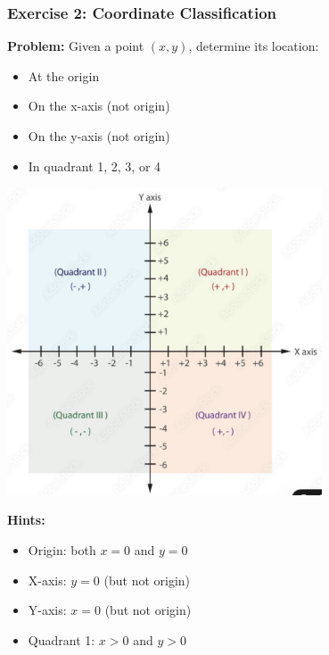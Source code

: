 \documentclass{beamer}
\begin{document}
\begin{frame}[fragile]
\frametitle{Exercise 2: Coordinate Classification}
\textbf{Problem:} Given a point $(x, y)$, determine its location:
\begin{itemize}
    \item At the origin
    \item On the x-axis (not origin)
    \item On the y-axis (not origin)
    \item In quadrant 1, 2, 3, or 4
\end{itemize}

\begin{center}
\includegraphics[width=0.7\textwidth]{../images/06_coordinate-plane-quadrants.jpg}
\end{center}

\vspace{0.2cm}
\textbf{Hints:}
\begin{itemize}
    \item Origin: both $x = 0$ and $y = 0$
    \item X-axis: $y = 0$ (but not origin)
    \item Y-axis: $x = 0$ (but not origin)
    \item Quadrant 1: $x > 0$ and $y > 0$
\end{itemize}
\end{frame}
\end{document}
